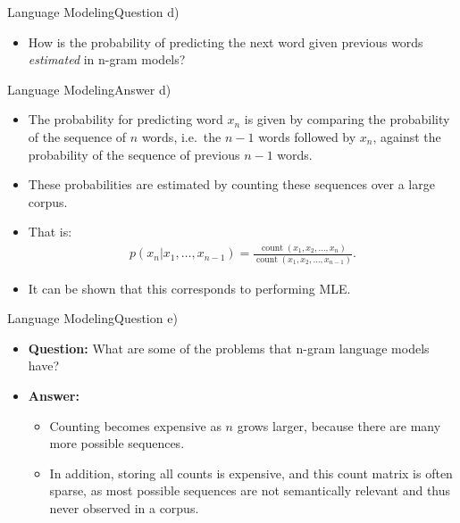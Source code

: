 \documentclass[t]{beamer}
\begin{document}
\begin{frame}{Language Modeling}{Question d)}
    \begin{itemize}
        \item How is the probability of predicting the next word given previous
              words \emph{estimated} in n-gram models?
    \end{itemize}
\end{frame}

\begin{frame}{Language Modeling}{Answer d)}
    \begin{itemize}
        \item The probability for predicting word $x_n$ is given by comparing
              the probability of the sequence of $n$ words, i.e.\ the $n-1$
              words followed by $x_n$, against the probability of the sequence
              of previous $n-1$ words.
        \item These probabilities are estimated by counting these sequences over
              a large corpus.
        \item That is:
              \begin{align*}
                  p(x_n|x_1,\ldots,x_{n-1}) = \frac{\operatorname{count}(x_1,x_2,\ldots,x_n)}{\operatorname{count}(x_1,x_2,\ldots,x_{n-1})}.
              \end{align*}
        \item It can be shown that this corresponds to performing MLE.
    \end{itemize}
\end{frame}

\begin{frame}{Language Modeling}{Question e)}
    \begin{itemize}
        \item \textbf{Question:} What are some of the problems that n-gram
              language models have?
              \pause
        \item \textbf{Answer:}
              \begin{itemize}
                  \item Counting becomes expensive as $n$ grows larger,
                        because there are many more possible sequences.
                  \item In addition, storing all counts is expensive, and this
                        count matrix is often sparse, as most possible sequences
                        are not semantically relevant and thus never observed in
                        a corpus.
              \end{itemize}
    \end{itemize}
\end{frame}
\end{document}
